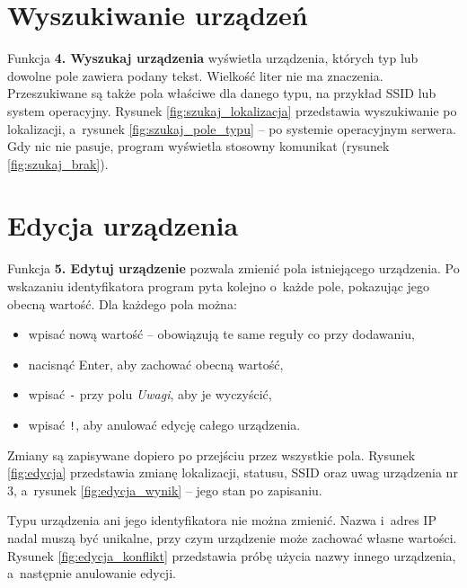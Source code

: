 
\section{Wyszukiwanie urządzeń}

Funkcja \textbf{4. Wyszukaj urządzenia} wyświetla urządzenia, których typ lub dowolne pole zawiera podany tekst. Wielkość liter nie ma znaczenia. Przeszukiwane są także pola właściwe dla danego typu, na przykład SSID lub system operacyjny. Rysunek \ref{fig:szukaj_lokalizacja} przedstawia wyszukiwanie po lokalizacji, a~rysunek \ref{fig:szukaj_pole_typu} -- po systemie operacyjnym serwera. Gdy nic nie pasuje, program wyświetla stosowny komunikat (rysunek \ref{fig:szukaj_brak}).


\section{Edycja urządzenia}

Funkcja \textbf{5. Edytuj urządzenie} pozwala zmienić pola istniejącego urządzenia. Po wskazaniu identyfikatora program pyta kolejno o~każde pole, pokazując jego obecną wartość. Dla każdego pola można:

\begin{itemize}
	\item wpisać nową wartość -- obowiązują te same reguły co przy dodawaniu,
	\item nacisnąć Enter, aby zachować obecną wartość,
	\item wpisać \texttt{-} przy polu \textit{Uwagi}, aby je wyczyścić,
	\item wpisać \texttt{!}, aby anulować edycję całego urządzenia.
\end{itemize}

Zmiany są zapisywane dopiero po przejściu przez wszystkie pola. Rysunek \ref{fig:edycja} przedstawia zmianę lokalizacji, statusu, SSID oraz uwag urządzenia nr 3, a~rysunek \ref{fig:edycja_wynik} -- jego stan po zapisaniu.


Typu urządzenia ani jego identyfikatora nie można zmienić. Nazwa i~adres IP nadal muszą być unikalne, przy czym urządzenie może zachować własne wartości. Rysunek \ref{fig:edycja_konflikt} przedstawia próbę użycia nazwy innego urządzenia, a~następnie anulowanie edycji.

